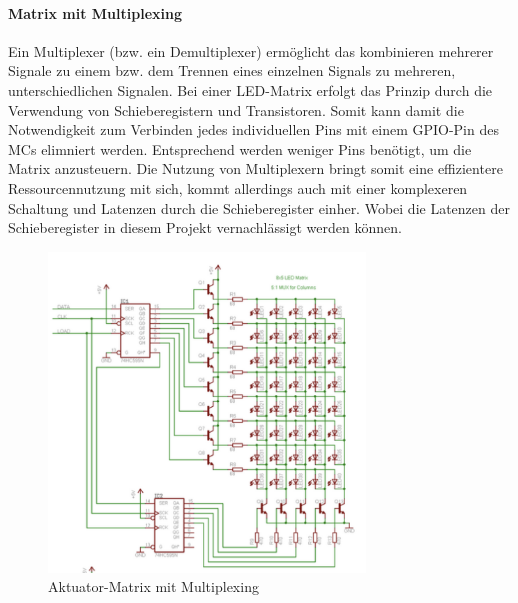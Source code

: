 \paragraph{Matrix mit Multiplexing}
Ein Multiplexer (bzw. ein Demultiplexer) ermöglicht das kombinieren mehrerer Signale zu einem bzw. dem Trennen eines einzelnen Signals zu mehreren, unterschiedlichen Signalen.
Bei einer LED-Matrix erfolgt das Prinzip durch die Verwendung von Schieberegistern und Transistoren.
Somit kann damit die Notwendigkeit zum Verbinden jedes individuellen Pins mit einem GPIO-Pin des \ac{MC}s elimniert werden.
Entsprechend werden weniger Pins benötigt, um die Matrix anzusteuern.
Die Nutzung von Multiplexern bringt somit eine effizientere Ressourcennutzung mit sich, kommt allerdings auch mit einer komplexeren Schaltung und Latenzen durch die Schieberegister einher. %
Wobei die Latenzen der Schieberegister in diesem Projekt vernachlässigt werden können.
\begin{figure}[htbp]
	\centering
	\includegraphics[width=0.75\textwidth]{img/matrixMuxSchaltung}
	\caption{Aktuator-Matrix mit Multiplexing}
	\label{fig:AktMatrixMux}
\end{figure}

